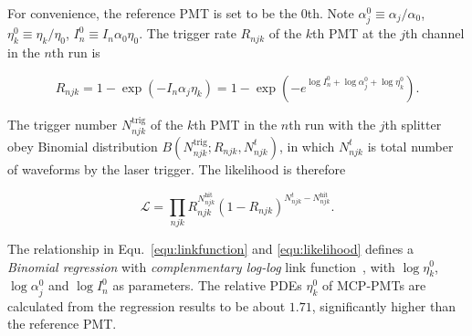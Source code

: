 For convenience, the reference PMT is set to be the 0th. Note $\alpha_j^0\equiv\alpha_j/{\alpha_0}$, $\eta_k^0\equiv\eta_k/{\eta_0}$, $I_n^0\equiv I_n\alpha_0\eta_0$.  The trigger rate $R_{njk}$ of the $k$th PMT at the $j$th channel in the $n$th run is

\begin{equation}
    \label{equ:linkfunction}
    R_{njk}=1-\exp\left(-I_n\alpha_j\eta_k\right)=1-\exp\left(-e^{\log{I_n^0}+\log{\alpha_j^0}+\log{\eta_k^0}}\right).
\end{equation}

The trigger number $N^{\mathrm{trig}}_{njk}$ of the $k$th PMT in the $n$th run with the $j$th splitter obey Binomial distribution $B(N^{\mathrm{trig}}_{njk};R_{njk},N^t_{njk})$, in which $N^t_{njk}$ is total number of waveforms by the laser trigger. The likelihood is therefore

\begin{equation}
    \label{equ:likelihood}
    \mathcal{L}=\prod_{njk}{R_{njk}^{N^\mathrm{hit}_{njk}}(1-R_{njk})^{N^t_{njk}-N^{\mathrm{hit}}_{njk}}}.
\end{equation}

The relationship in Equ.~\eqref{equ:linkfunction} and \eqref{equ:likelihood} defines a \emph{Binomial regression} with \emph{complenmentary log-log} link function~\cite{glm}, with $\log{\eta_k^0}$, $\log{\alpha_j^0}$ and $\log{I_n^0}$ as parameters. The relative PDEs $\eta_k^0$ of MCP-PMTs are calculated from the regression results to be about $1.71$, significantly higher than the reference PMT.
